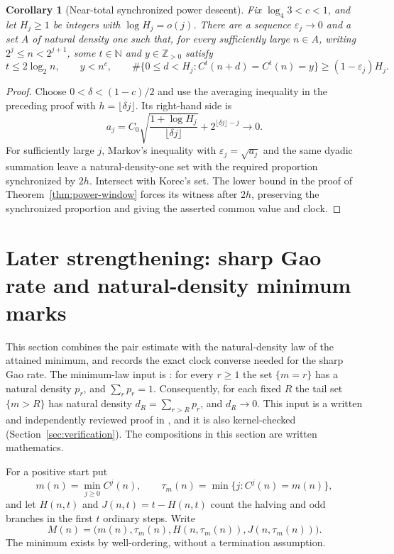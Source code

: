 \documentclass[11pt]{amsart}
\newtheorem{corollary}[theorem]{Corollary}
\theoremstyle{definition}
\theoremstyle{remark}
\newcommand{\N}{\mathbb N}
\newcommand{\Z}{\mathbb Z}
\begin{document}
\begin{corollary}[Near-total synchronized power descent]\label{cor:majority-power}
Fix $\log_4 3<c<1$, and let $H_j\ge1$ be integers with $\log H_j=o(j)$.
There are a sequence $\varepsilon_j\to0$ and a set $A$ of natural density one such that, for every sufficiently large $n\in A$, writing $2^j\le n<2^{j+1}$, some $t\in\N$ and $y\in\Z_{>0}$ satisfy
\[
 t\le2\log_2 n,\qquad y<n^c,\qquad
 \#\{0\le d<H_j:C^t(n+d)=C^t(n)=y\}\ge(1-\varepsilon_j)H_j.
\]
\end{corollary}
\begin{proof}
Choose $0<\delta<(1-c)/2$ and use the averaging inequality in the preceding proof with $h=\lfloor\delta j\rfloor$.
Its right-hand side is
\[
 a_j=C_0\sqrt{\frac{1+\log H_j}{\lfloor\delta j\rfloor}}
       +2^{\lfloor\delta j\rfloor-j}\longrightarrow0.
\]
For sufficiently large $j$, Markov's inequality with $\varepsilon_j=\sqrt{a_j}$ and the same dyadic summation leave a natural-density-one set with the required proportion synchronized by $2h$.
Intersect with Korec's set. The lower bound in the proof of Theorem~\ref{thm:power-window} forces its witness after $2h$, preserving the synchronized proportion and giving the asserted common value and clock.
\end{proof}

\section{Later strengthening: sharp Gao rate and natural-density minimum marks}\label{sec:later-strengthening}
This section combines the pair estimate with the natural-density law of the attained minimum, and records the exact clock converse needed for the sharp Gao rate. The minimum-law input is \cite[Corollary~3.8]{BM}: for every $r\ge1$ the set $\{m=r\}$ has a natural density $p_r$, and $\sum_rp_r=1$. Consequently, for each fixed $R$ the tail set $\{m>R\}$ has natural density $d_R=\sum_{r>R}p_r$, and $d_R\to0$. This input is a written and independently reviewed proof in \cite{BM}, and it is also kernel-checked (Section~\ref{sec:verification}). The compositions in this section are written mathematics.

For a positive start put
\[
 m(n)=\min_{j\ge0}C^j(n),\qquad
 \tau_m(n)=\min\{j:C^j(n)=m(n)\},
\]
and let $H(n,t)$ and $J(n,t)=t-H(n,t)$ count the halving and odd branches in the first $t$ ordinary steps. Write
\[
 M(n)=\bigl(m(n),\tau_m(n),H(n,\tau_m(n)),J(n,\tau_m(n))\bigr).
\]
The minimum exists by well-ordering, without a termination assumption.
\end{document}

